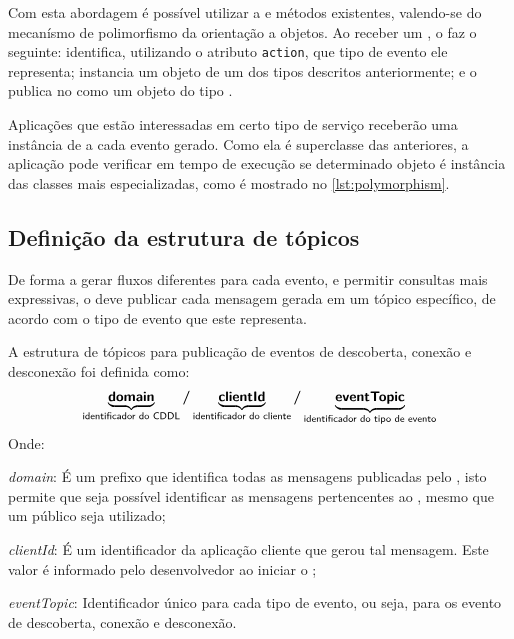 Com esta abordagem é possível utilizar a \api e métodos existentes, valendo-se do mecanísmo de polimorfismo da orientação a objetos.
Ao receber um \sensordata, o \qocevaluator faz o seguinte: identifica, utilizando o atributo \texttt{action}, que tipo de evento ele representa; instancia um objeto de um dos tipos descritos anteriormente; e o publica no \broker \mqtt como um objeto do tipo \msg.

Aplicações que estão interessadas em certo tipo de serviço receberão uma instância de \msg a cada evento gerado.
Como ela é superclasse das anteriores, a aplicação pode verificar em tempo de execução se determinado objeto é instância das classes mais especializadas, como é mostrado no \autoref{lst:polymorphism}.



\subsection{Definição da estrutura de tópicos}

De forma a gerar fluxos diferentes para cada evento, e permitir consultas mais expressivas, o \qocevaluator deve publicar cada mensagem gerada em um tópico específico, de acordo com o tipo de evento que este representa.

A estrutura de tópicos para publicação de eventos de descoberta, conexão e desconexão foi definida como:
\[
	\underbrace{\bm{\mathsf{domain}}}_{\text{\textsf{identificador do CDDL}}}
	\bm{/}
	\underbrace{\bm{\mathsf{clientId}}}_{\text{\textsf{identificador do cliente}}}
	\bm{/}
	\underbrace{\bm{\mathsf{eventTopic}}}_{\text{\textsf{identificador do tipo de evento}}}
\]
Onde:

\begin{alineas}
	\item \emph{domain}: É um prefixo que identifica todas as mensagens publicadas pelo \cddl, isto permite que seja possível identificar as mensagens pertencentes ao \middleware, mesmo que um \broker público seja utilizado;
	\item \emph{clientId}: É um identificador da aplicação cliente que gerou tal mensagem. Este valor é informado pelo desenvolvedor ao iniciar o \cddl;
	\item \emph{eventTopic}: Identificador único para cada tipo de evento, ou seja, para os evento de descoberta, conexão e desconexão.
\end{alineas}

